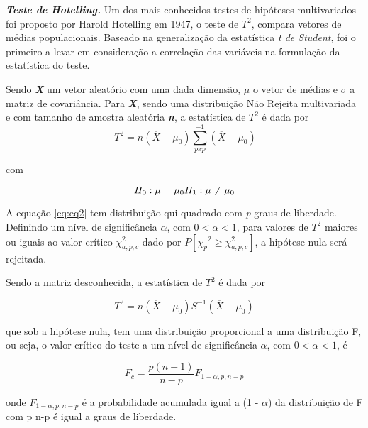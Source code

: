 \documentclass[12pt,fleqn]{article}
\begin{document}
{\vspace{0.5cm}
\textbf{\textit{Teste de Hotelling.}} Um dos mais conhecidos testes de hipóteses multivariados foi proposto por Harold Hotelling em 1947, o teste de $T^2$, compara vetores de médias populacionais. Baseado na generalização da estatística \textit{t de Student}, foi o primeiro a levar em consideração a correlação das variáveis na formulação da estatística do teste.

Sendo \textbf{\textit{X}} um vetor aleatório com uma dada dimensão, \textbf{\textit{$\mu$}} o vetor de médias e \textbf{\textit{$\sigma$}} a matriz de covariância. Para \textbf{\textit{X}}, sendo uma distribuição Não Rejeita multivariada e com tamanho de amostra aleatória \textbf{\textit{n}}, a estatística de $T^2$ é dada por
\begin{equation}
\ T^2 = n(\overline{X} - \mu_0) \sum_{pxp}^{-1} {(\overline{X} - \mu_0)}
\label{eq:eq2}
\end{equation}

com

\begin{equation}
 H_0 : \mu = \mu_0 \\
 H_1 : \mu \neq \mu_0
\label{eq:eq3}
\end{equation}

A equação \ref{eq:eq2} tem distribuição qui-quadrado com \textit{p} graus de liberdade. Definindo um nível de significância $\alpha$, com $0 < \alpha < 1$, para valores de $T^2$  maiores ou iguais ao valor crítico ${\chi^2_{a,p,c}}$ dado por $P[{\chi_p}^2 \geq {\chi^2_{a,p,c}}]$,  a hipótese nula será rejeitada.   

Sendo a matriz desconhecida, a estatística de $T^2$ é dada por

\begin{equation}
T^2 = n(\overline{X} -\mu_0) S^{-1}(\overline{X} - \mu_0)
\label{eq:eq4}
\end{equation}

que sob a hipótese nula, tem uma distribuição proporcional a uma distribuição F, ou seja, o valor crítico do teste a um nível de significância $\alpha$, com $0 < \alpha < 1$, é

\begin{equation}
F_c = \frac{p(n-1)}{n-p} F_{1-\alpha, p, n - p}
\label{eq:eq5}
\end{equation}

onde $F_{1-\alpha, p, n - p}$ é a probabilidade acumulada igual a (1 - $\alpha$) da distribuição de F com p
n-p é igual a graus de liberdade.

}
\end{document}
